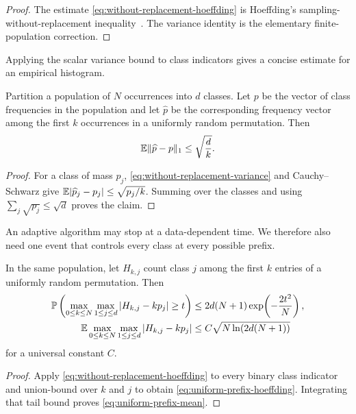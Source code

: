 \begin{proof}
The estimate \cref{eq:without-replacement-hoeffding} is Hoeffding's
sampling-without-replacement inequality~\cite[Section~6]{Hoeffding1963}.
The variance identity is the elementary finite-population correction.
\end{proof}

Applying the scalar variance bound to class indicators gives a concise
estimate for an empirical histogram.

\begin{lemma}
\label{lem:without-replacement-histogram}
Partition a population of $N$ occurrences into $d$ classes.  Let $p$ be the
vector of class frequencies in the population and let $\widehat p$ be the
corresponding frequency vector among the first $k$ occurrences in a uniformly
random permutation.  Then
\begin{equation}
 \mathbb{E}\|\widehat p-p\|_1\le\sqrt{\frac d k}.
 \label{eq:without-replacement-histogram}
\end{equation}
\end{lemma}

\begin{proof}
For a class of mass $p_j$, \cref{eq:without-replacement-variance} and
Cauchy--Schwarz give
$\mathbb{E}|\widehat p_j-p_j|\le\sqrt{p_j/k}$.  Summing over the classes and using
$\sum_j\sqrt{p_j}\le\sqrt d$ proves the claim.
\end{proof}

An adaptive algorithm may stop at a data-dependent time.  We therefore also
need one event that controls every class at every possible prefix.

\begin{lemma}
\label{lem:uniform-prefix-histogram}
In the same population, let $H_{k,j}$ count class $j$ among the first $k$
entries of a uniformly random permutation.  Then
\begin{align}
 \mathbb{P}\left(
   \max_{0\le k\le N}\max_{1\le j\le d}|H_{k,j}-kp_j|\ge t
 \right)
 &\le 2d(N+1)\exp\!\left(-\frac{2t^2}{N}\right),
 \label{eq:uniform-prefix-hoeffding}\\
 \mathbb{E}\max_{0\le k\le N}\max_{1\le j\le d}|H_{k,j}-kp_j|
 &\le C\sqrt{N\ln(2d(N+1))}
 \label{eq:uniform-prefix-mean}
\end{align}
for a universal constant $C$.
\end{lemma}

\begin{proof}
Apply \cref{eq:without-replacement-hoeffding} to every binary class indicator
and union-bound over $k$ and $j$ to obtain
\cref{eq:uniform-prefix-hoeffding}.  Integrating that tail bound proves
\cref{eq:uniform-prefix-mean}.
\end{proof}

